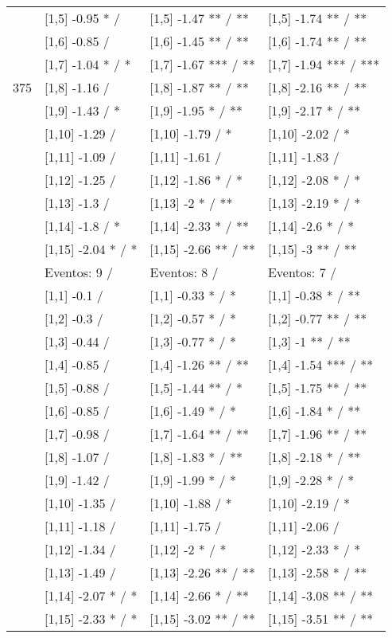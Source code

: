 \begin{table}
\begin{tabular}[t]{llll}
 & {}[1,5] -0.95 * / & {}[1,5] -1.47 ** / ** & {}[1,5] -1.74 ** / **\\
 & {}[1,6] -0.85  / & {}[1,6] -1.45 ** / ** & {}[1,6] -1.74 ** / **\\
 & {}[1,7] -1.04 * / * & {}[1,7] -1.67 *** / ** & {}[1,7] -1.94 *** / ***\\
375 & {}[1,8] -1.16  / & {}[1,8] -1.87 ** / ** & {}[1,8] -2.16 ** / **\\
\addlinespace
 & {}[1,9] -1.43  / * & {}[1,9] -1.95 * / ** & {}[1,9] -2.17 * / **\\
 & {}[1,10] -1.29  / & {}[1,10] -1.79  / * & {}[1,10] -2.02  / *\\
 & {}[1,11] -1.09  / & {}[1,11] -1.61  / & {}[1,11] -1.83  /\\
 & {}[1,12] -1.25  / & {}[1,12] -1.86 * / * & {}[1,12] -2.08 * / *\\
 & {}[1,13] -1.3  / & {}[1,13] -2 * / ** & {}[1,13] -2.19 * / *\\
\addlinespace
 & {}[1,14] -1.8  / * & {}[1,14] -2.33 * / ** & {}[1,14] -2.6 * / *\\
 & {}[1,15] -2.04 * / * & {}[1,15] -2.66 ** / ** & {}[1,15] -3 ** / **\\
 & Eventos:  9 / & Eventos:  8 / & Eventos:  7 /\\
 & {}[1,1] -0.1  / & {}[1,1] -0.33 * / * & {}[1,1] -0.38 * / **\\
 & {}[1,2] -0.3  / & {}[1,2] -0.57 * / * & {}[1,2] -0.77 ** / **\\
\addlinespace
 & {}[1,3] -0.44  / & {}[1,3] -0.77 * / * & {}[1,3] -1 ** / **\\
 & {}[1,4] -0.85  / & {}[1,4] -1.26 ** / ** & {}[1,4] -1.54 *** / **\\
 & {}[1,5] -0.88  / & {}[1,5] -1.44 ** / * & {}[1,5] -1.75 ** / **\\
 & {}[1,6] -0.85  / & {}[1,6] -1.49 * / * & {}[1,6] -1.84 * / **\\
 & {}[1,7] -0.98  / & {}[1,7] -1.64 ** / ** & {}[1,7] -1.96 ** / **\\
\addlinespace
500 & {}[1,8] -1.07  / & {}[1,8] -1.83 * / ** & {}[1,8] -2.18 * / **\\
 & {}[1,9] -1.42  / & {}[1,9] -1.99 * / * & {}[1,9] -2.28 * / *\\
 & {}[1,10] -1.35  / & {}[1,10] -1.88  / * & {}[1,10] -2.19  / *\\
 & {}[1,11] -1.18  / & {}[1,11] -1.75  / & {}[1,11] -2.06  /\\
 & {}[1,12] -1.34  / & {}[1,12] -2 * / * & {}[1,12] -2.33 * / *\\
\addlinespace
 & {}[1,13] -1.49  / & {}[1,13] -2.26 ** / ** & {}[1,13] -2.58 * / **\\
 & {}[1,14] -2.07 * / * & {}[1,14] -2.66 * / ** & {}[1,14] -3.08 ** / **\\
 & {}[1,15] -2.33 * / * & {}[1,15] -3.02 ** / ** & {}[1,15] -3.51 ** / **\\
\bottomrule
\end{tabular}
\end{table}
